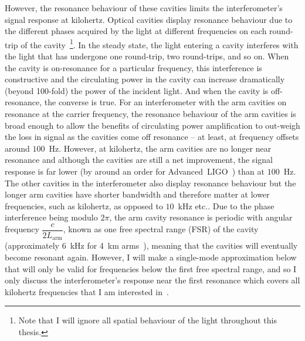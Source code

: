 However, the resonance behaviour of these cavities limits the interferometer's signal response at kilohertz. Optical cavities display resonance behaviour due to the different phases acquired by the light at different frequencies on each round-trip of the cavity~\footnote{Note that I will ignore all spatial behaviour of the light throughout this thesis.}. In the steady state, the light entering a cavity interferes with the light that has undergone one round-trip, two round-trips, and so on. When the cavity is on-resonance for a particular frequency, this interference is constructive and the circulating power in the cavity can increase dramatically (beyond 100-fold) the power of the incident light. And when the cavity is off-resonance, the converse is true. 
For an interferometer with the arm cavities on resonance at the carrier frequency, the resonance behaviour of the arm cavities is broad enough to allow the benefits of circulating power amplification to out-weigh the loss in signal as the cavities come off resonance -- at least, at frequency offsets around $100$~Hz. However, at kilohertz, the arm cavities are no longer near resonance and although the cavities are still a net improvement, the signal response is far lower (by around an order for Advanced~LIGO~\cite{}) than at $100$~Hz. The other cavities in the interferometer also display resonance behaviour but the longer arm cavities have shorter bandwidth and therefore matter at lower frequencies, such as kilohertz, as opposed to $10$~kHz etc.. 
Due to the phase interference being modulo $2\pi$, the arm cavity resonance is periodic with angular frequency $\dfrac{c}{2L_\text{arm}}$, known as one free spectral range (FSR) of the cavity (approximately 6~kHz for 4~km arms~), meaning that the cavities will eventually become resonant again. However, I will make a single-mode approximation below that will only be valid for frequencies below the first free spectral range, and so I only discuss the interferometer's response near the first resonance which covers all kilohertz frequencies that I am interested in~.

